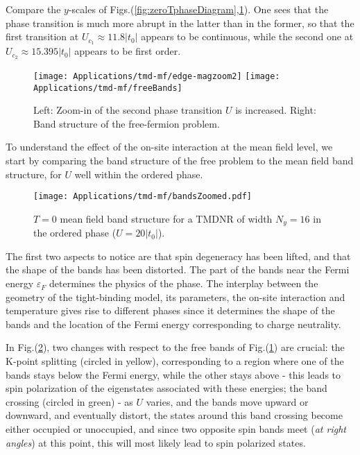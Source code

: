 Compare the $y$-scales of Figs.(\ref{fig:zeroTphaseDiagram},\ref{fig:freeBands}).
One sees that the phase transition is much more abrupt in the latter than in the former, so that the first transition at $U_{c_1} \approx 11.8 |t_0|$ appears to be continuous, while the second one at $U_{c_2} \approx 15.395 |t_0|$ appears to be first order.
\begin{figure}[H]
\hspace{0.3cm}
\texttt{[image: Applications/tmd-mf/edge-magzoom2]}
\hspace{0.5cm}
\texttt{[image: Applications/tmd-mf/freeBands]}
	\caption[Zoom-in of the second phase transition (as $U$ is increased). Band structure of the free-fermion problem.]{Left: Zoom-in of the second phase transition $U$ is increased. Right: Band structure of the free-fermion problem.
	\label{fig:freeBands}}
\end{figure}
To understand the effect of the on-site interaction at the mean field level, we start by comparing the band structure of the free problem to the mean field band structure, for $U$ well within the ordered phase.
\begin{figure}[H]
\centering
\texttt{[image: Applications/tmd-mf/bandsZoomed.pdf]}
	\caption[$T=0$ mean field band structure for a \ac{TMDNR} of width $N_y = 16$ in the ordered phase, at $U=20 | t_0 |$.]{$T=0$ mean field band structure for a \ac{TMDNR} of width $N_y = 16$ in the ordered phase ($U=20 | t_0 |$).}
	\label{fig:bandsZoomed}
\end{figure}

The first two aspects to notice are that spin degeneracy has been lifted, and that the shape of the bands has been distorted.
The part of the bands near the Fermi energy $\varepsilon_F$ determines the physics of the phase.
The interplay between the geometry of the tight-binding model, its parameters, the on-site interaction and temperature gives rise to different phases since it determines the shape of the bands and the location of the Fermi energy corresponding to charge neutrality.

In Fig.(\ref{fig:bandsZoomed}), two changes with respect to the free bands of Fig.(\ref{fig:freeBands}) are crucial:
the K-point splitting (circled in yellow), corresponding to a region where one of the bands stays below the Fermi energy, while the other stays above - this leads to spin polarization of the eigenstates associated with these energies; the band crossing (circled in green) - as $U$ varies, and the bands move upward or downward, and eventually distort, the states around this band crossing become either occupied or unoccupied, and since two opposite spin bands meet (\emph{at right angles}) at this point, this will most likely lead to spin polarized states.

